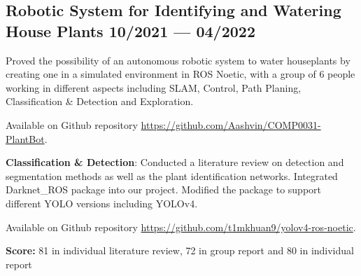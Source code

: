 \subsection{
    Robotic System for Identifying and Watering House Plants 
    \hfill 10/2021 --- 04/2022
}
    \begin{zitemize}
        \item   Proved the possibility of an autonomous robotic system to water houseplants
                by creating one in a simulated environment in ROS Noetic, 
                with a group of 6 people working in different aspects including
                SLAM, Control, Path Planing, Classification \& Detection and Exploration.
        \item   Available on Github repository
                \url{https://github.com/Aashvin/COMP0031-PlantBot}.
        \item   \textbf{Classification \& Detection}: 
                Conducted a literature review on detection and 
                segmentation methods as well as the plant identification networks.
                Integrated Darknet\_ROS package into our project.
                Modified the package to support different YOLO versions including YOLOv4.
        \item   Available on Github repository
                \url{https://github.com/t1mkhuan9/yolov4-ros-noetic}.
        \item   \textbf{Score:}
                81 in individual literature review, 72 in group report and 80 in individual report
    \end{zitemize}


